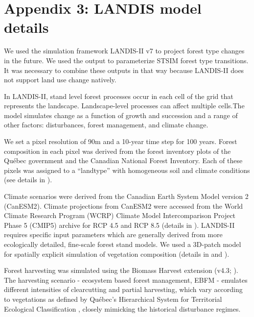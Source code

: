 
\chapter*{\textbf{Appendix 3: LANDIS model details \\ \hspace{1em}}}

\setcounter{chapter}{6}
\setcounter{table}{0}
\setcounter{figure}{0}

We used the simulation framework LANDIS-II v7 \citep{scheller_forest_2004} to project forest type changes in the future. We used the output to parameterize STSIM forest type transitions. It was necessary to combine these outputs in that way because LANDIS-II does not support land use change natively.

In LANDIS-II, stand level forest processes occur in each cell of the grid that represents the landscape. Landscape-level processes can affect multiple cells.The model simulates change as a function of growth and succession and a range of other factors: disturbances, forest management, and climate change. 

We set a pixel resolution of 90m and a 10-year time step for 100 years. Forest composition in each pixel was derived from the forest inventory plots of the Québec government and the Canadian National Forest Inventory. Each of these pixels was assigned to a “landtype” with homogeneous soil and climate conditions (see details in \cite{boulanger_climate_2019}).

Climate scenarios were derived from the Canadian Earth System Model version 2 (CanESM2). Climate projections from CanESM2 were accessed from the World Climate Research Program (WCRP) Climate Model Intercomparison Project Phase 5 (CMIP5) archive for RCP 4.5 and RCP 8.5 (details in \cite{boulanger_climate_2019}).
LANDIS-II requires specific input parameters which are generally derived from more ecologically detailed, fine-scale forest stand models. We used a 3D-patch model for spatially explicit simulation of vegetation composition (details in \cite{lexer_modified_2001} and \cite{tremblay_harvesting_2018}).

Forest harvesting was simulated using the Biomass Harvest extension (v4.3; \cite{gustafson_spatial_2000}). The harvesting scenario - ecosystem based forest management, EBFM - emulates different intensities of clearcutting and partial harvesting, which vary according to vegetations as defined by Québec’s Hierarchical System for Territorial Ecological Classification \citep{bergeron_quebec_1992}, closely mimicking the historical disturbance regimes.